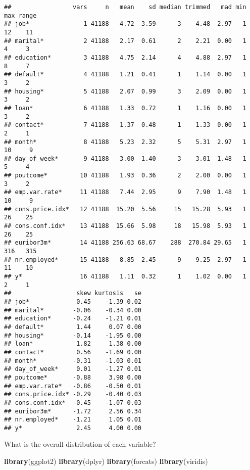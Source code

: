 \documentclass[
]{article}
\newenvironment{Shaded}{\begin{snugshade}}{\end{snugshade}}
\newcommand{\FunctionTok}[1]{\textcolor[rgb]{0.13,0.29,0.53}{\textbf{#1}}}
\newcommand{\NormalTok}[1]{#1}
\begin{document}
\begin{verbatim}
##                 vars     n   mean    sd median trimmed   mad min max range
## job*               1 41188   4.72  3.59      3    4.48  2.97   1  12    11
## marital*           2 41188   2.17  0.61      2    2.21  0.00   1   4     3
## education*         3 41188   4.75  2.14      4    4.88  2.97   1   8     7
## default*           4 41188   1.21  0.41      1    1.14  0.00   1   3     2
## housing*           5 41188   2.07  0.99      3    2.09  0.00   1   3     2
## loan*              6 41188   1.33  0.72      1    1.16  0.00   1   3     2
## contact*           7 41188   1.37  0.48      1    1.33  0.00   1   2     1
## month*             8 41188   5.23  2.32      5    5.31  2.97   1  10     9
## day_of_week*       9 41188   3.00  1.40      3    3.01  1.48   1   5     4
## poutcome*         10 41188   1.93  0.36      2    2.00  0.00   1   3     2
## emp.var.rate*     11 41188   7.44  2.95      9    7.90  1.48   1  10     9
## cons.price.idx*   12 41188  15.20  5.56     15   15.28  5.93   1  26    25
## cons.conf.idx*    13 41188  15.66  5.98     18   15.98  5.93   1  26    25
## euribor3m*        14 41188 256.63 68.67    288  270.84 29.65   1 316   315
## nr.employed*      15 41188   8.85  2.45      9    9.25  2.97   1  11    10
## y*                16 41188   1.11  0.32      1    1.02  0.00   1   2     1
##                  skew kurtosis   se
## job*             0.45    -1.39 0.02
## marital*        -0.06    -0.34 0.00
## education*      -0.24    -1.21 0.01
## default*         1.44     0.07 0.00
## housing*        -0.14    -1.95 0.00
## loan*            1.82     1.38 0.00
## contact*         0.56    -1.69 0.00
## month*          -0.31    -1.03 0.01
## day_of_week*     0.01    -1.27 0.01
## poutcome*       -0.88     3.98 0.00
## emp.var.rate*   -0.86    -0.50 0.01
## cons.price.idx* -0.29    -0.40 0.03
## cons.conf.idx*  -0.45    -1.07 0.03
## euribor3m*      -1.72     2.56 0.34
## nr.employed*    -1.21     1.05 0.01
## y*               2.45     4.00 0.00
\end{verbatim}

What is the overall distribution of each variable?

\begin{Shaded}
\begin{Highlighting}[]
\FunctionTok{library}\NormalTok{(ggplot2)}
\FunctionTok{library}\NormalTok{(dplyr)}
\FunctionTok{library}\NormalTok{(forcats)}
\FunctionTok{library}\NormalTok{(viridis)}
\end{Highlighting}
\end{Shaded}
\end{document}
